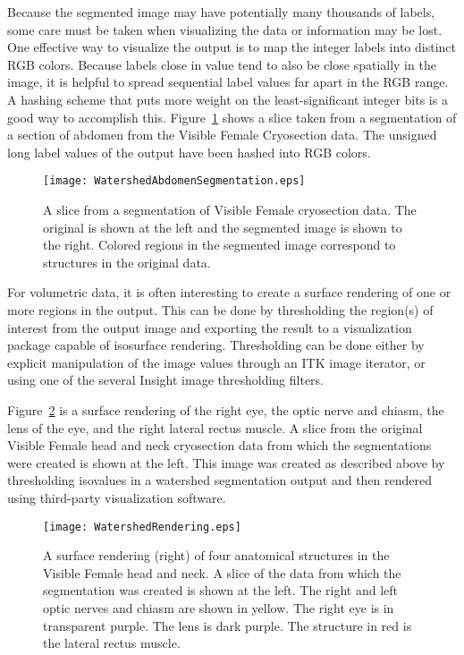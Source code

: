 Because the segmented image may have potentially many thousands of labels, some
care must be taken when visualizing the data or information may be lost.  One
effective way to visualize the output is to map the integer labels into
distinct RGB colors.  Because labels close in value tend to also be close
spatially in the image, it is helpful to spread sequential label values far
apart in the RGB range.  A hashing scheme that puts more weight on the
least-significant integer bits is a good way to accomplish this.
Figure~\ref{fig:colorVisWatersheds} shows a slice taken from a segmentation of
a section of abdomen from the Visible Female Cryosection data.  The unsigned
long label values of the output have been hashed into RGB colors.

\begin{figure}
\centering
\texttt{[image: WatershedAbdomenSegmentation.eps]}
\caption[Watershed segmenting the Visible Woman]{A slice from a segmentation of
Visible Female cryosection data.  The original is shown at the left and the
segmented image is shown to the right. Colored regions in the segmented image
correspond to structures in the original data. }
\protect\label{fig:colorVisWatersheds}
\end{figure}

For volumetric data, it is often interesting to create a surface rendering of
one or more regions in the output.  This can be done by thresholding the
region(s) of interest from the output image and exporting the result to a
visualization package capable of isosurface rendering.  Thresholding can be
done either by explicit manipulation of the image values through an ITK image
iterator, or using one of the several Insight image thresholding filters.

Figure~\ref{fig:surfaceRenderingWatersheds} is a surface rendering of the right
eye, the optic nerve and chiasm, the lens of the eye, and the right lateral
rectus muscle.  A slice from the original Visible Female head and neck
cryosection data from which the segmentations were created is shown at the
left.  This image was created as described above by thresholding isovalues in a
watershed segmentation output and then rendered using third-party visualization
software.

\begin{figure}
\centering
\texttt{[image: WatershedRendering.eps]}
\caption[Watershed segmentation rendered in $3D$]{A surface rendering (right)
of four anatomical structures in the Visible Female head and neck. A slice of
the data from which the segmentation was created is shown at the left.  The
right and left optic nerves and chiasm are shown in yellow.  The right eye is
in transparent purple.  The lens is dark purple.  The structure in red is the
lateral rectus muscle.} \protect\label{fig:surfaceRenderingWatersheds}
\end{figure}

